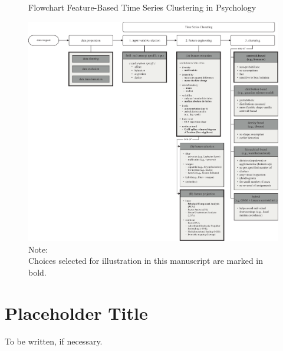 \documentclass[man, 12pt, a4paper]{apa7}
\theoremstyle{break}
\theoremstyle{plain}
\begin{document}
\begin{figure}
  \caption{Flowchart Feature-Based Time Series Clustering in Psychology}
  \label{fig:TSCFlow}
  \centering\includegraphics[width=\textwidth]{figures/TS Cluster Flow/TimeSeriesClusterFlowSelection.pdf}
  \caption*{Note: \\
  Choices selected for illustration in this manuscript are marked in bold.}
\end{figure}

\printbibliography

\appendix

\section{Placeholder Title}
\label{app:AppendixTitle}
To be written, if necessary.
\end{document}
